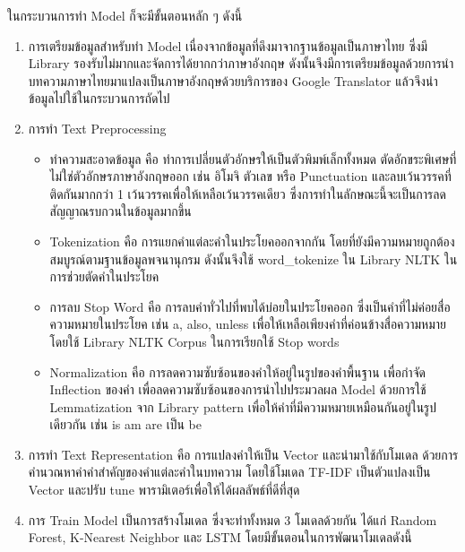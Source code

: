 \documentclass[12pt,oneside,openright,a4paper]{cpe-thai-project}
\begin{document}
  \hspace{1cm}ในกระบวนการทำ Model ก็จะมีขั้นตอนหลัก ๆ ดังนี้
  \begin{enumerate}
    \item การเตรียมข้อมูลสำหรับทำ Model
          \newline\hspace*{1cm}เนื่องจากข้อมูลที่ดึงมาจากฐานข้อมูลเป็นภาษาไทย ซึ่งมี Library รองรับไม่มากและจัดการได้ยากกว่าภาษาอังกฤษ 
          ดังนั้นจึงมีการเตรียมข้อมูลด้วยการนำบทความภาษาไทยมาแปลงเป็นภาษาอังกฤษด้วยบริการของ Google Translator แล้วจึงนำข้อมูลไปใช้ในกระบวนการถัดไป
    \item การทำ Text Preprocessing
          \begin{itemize}
            \item ทำความสะอาดข้อมูล คือ ทำการเปลี่ยนตัวอักษรให้เป็นตัวพิมพ์เล็กทั้งหมด ตัดอักขระพิเศษที่ไม่ใช่ตัวอักษรภาษาอังกฤษออก เช่น อิโมจิ ตัวเลข หรือ Punctuation 
            และลบเว้นวรรคที่ติดกันมากกว่า 1 เว้นวรรคเพื่อให้เหลือเว้นวรรคเดียว ซึ่งการทําในลักษณะนี้จะเป็นการลดสัญญาณรบกวนในข้อมูลมากขึ้น
            \item Tokenization คือ การแยกคำแต่ละคำในประโยคออกจากกัน โดยที่ยังมีความหมายถูกต้องสมบูรณ์ตามฐานข้อมูลพจนานุกรม 
            ดังนั้นจึงใช้ word\_tokenize ใน Library NLTK ในการช่วยตัดคำในประโยค
            \item การลบ Stop Word คือ การลบคำทั่วไปที่พบได้บ่อยในประโยคออก ซึ่งเป็นคำที่ไม่ค่อยสื่อความหมายในประโยค เช่น a, also, unless 
            เพื่อให้เหลือเพียงคำที่ค่อนข้างสื่อความหมาย โดยใช้ Library NLTK Corpus ในการเรียกใช้ Stop words
            \item Normalization คือ การลดความซับซ้อนของคำให้อยู่ในรูปของคำพื้นฐาน เพื่อกำจัด Inflection ของคำ 
            เพื่อลดความซับซ้อนของการนำไปประมวลผล Model ด้วยการใช้ Lemmatization จาก Library pattern 
            เพื่อให้คำที่มีความหมายเหมือนกันอยู่ในรูปเดียวกัน เช่น is am are เป็น be
          \end{itemize}
    \item การทำ Text Representation คือ การแปลงคำให้เป็น Vector และนำมาใช้กับโมเดล ด้วยการคำนวณหาค่าคำสำคัญของคำแต่ละคำในบทความ 
          โดยใช้โมเดล TF-IDF เป็นตัวแปลงเป็น Vector และปรับ tune พารามิเตอร์เพื่อให้ได้ผลลัพธ์ที่ดีที่สุด
    \item การ Train Model
          \newline\hspace*{1cm}เป็นการสร้างโมเดล ซึ่งจะทำทั้งหมด 3 โมเดลด้วยกัน ได้แก่ Random Forest, K-Nearest Neighbor และ LSTM
          โดยมีขั้นตอนในการพัฒนาโมเดลดังนี้

\end{enumerate}
\end{document}
